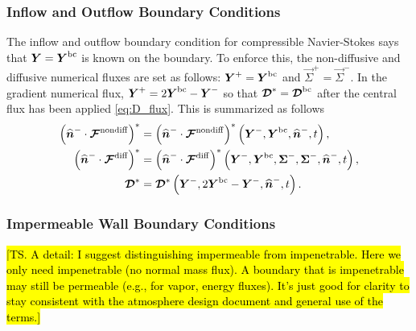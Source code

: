 \documentclass{report}
\begin{document}
\subsubsection{Inflow and Outflow Boundary Conditions}
The inflow and outflow boundary condition for compressible Navier-Stokes says
that $\vec{Y} = \vec{Y}^{\rm bc}$ is known on the boundary. To enforce this, the
non-diffusive and diffusive numerical fluxes are set as follows: $\vec{Y}^{+} = \vec{Y}^{\rm bc}$ and $\vec{\Sigma}^{+} = \vec{\Sigma}^{-}$. 
In the gradient
numerical flux, $\vec{Y}^{+} = 2\vec{Y}^{\rm bc} - \vec{Y}^{-}$ so that
$\diffusive^{*} = \diffusive^{\rm bc}$ after the central flux has been applied \eqref{eq:D_flux}.
This is summarized as follows
\begin{align}
  {\left( \nhat^{-} \cdot \Fnondiff\right)}^{*} &=
  {\left( \nhat^{-} \cdot \Fnondiff\right)}^{*}
  \left(\vec{Y}^{-}, \vec{Y}^{\rm bc}, \nhat^{-}, t\right),\\
  {\left( \nhat^{-} \cdot \Fdiff\right)}^{*} &=
  {\left( \nhat^{-} \cdot \Fdiff\right)}^{*}
  \left(\vec{Y}^{-}, \vec{Y}^{\rm bc}, \vec{\Sigma}^{-}, \vec{\Sigma}^{-},
  \nhat^{-}, t\right),\\
  \diffusive^{*} &=
  \diffusive^{*}
  \left(\vec{Y}^{-}, 2\vec{Y}^{\rm bc}-\vec{Y}^{-}, \nhat^{-}, t\right).
\end{align}

\subsubsection{Impermeable Wall Boundary Conditions}

\hl{[TS. A detail: I suggest distinguishing impermeable from impenetrable. Here we only need impenetrable (no normal mass flux). A boundary that is impenetrable may still be permeable (e.g., for vapor, energy fluxes). It's just good for clarity to stay consistent with the atmosphere design document and general use of the terms.]}
\end{document}

